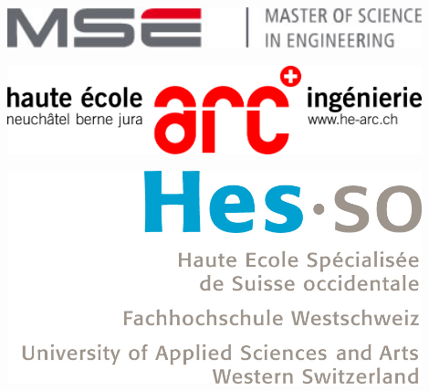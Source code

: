 \begin{titlepage}
\fontsize{5cm}{10}%
\selectfont

\begin{flushright}
\begin{minipage}{0.33\textwidth}
\begin{flushleft}
\includegraphics[width=0.9\textwidth]{./images/logos/mse_logo.jpg}
\end{flushleft}
\vspace{1.3cm}
\end{minipage}%
\begin{minipage}{0.33\textwidth}
\begin{center}
\includegraphics[width=0.9\textwidth]{./images/logos/he-arc-logo.png}
\end{center}
\vspace{1.3cm}
\end{minipage}%
\begin{minipage}{0.33\textwidth}
\begin{flushright}
\includegraphics[width=0.9\textwidth]{./images/logos/hes-so-logo.jpg}
\end{flushright}
\end{minipage}
\begin{flushleft}
\footnotesize
\vspace{-1cm}
\end{flushleft}
~\\[0.5cm]


\end{flushright}
\end{titlepage}
